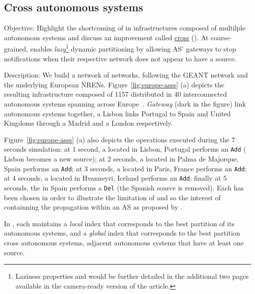 \subsection{Cross autonomous systems}
\begin{asparadesc}
\item[Objective:] Highlight the shortcoming of \NAME in
  infrastructures composed of multilple autonomous systems and
    discuss an improvement called \underline{cross} \underline{\NAME}
    (\NAMEC). At coarse-grained, \NAMEC enables
    \emph{lazy}\footnote{Laziness properties and \NAMEC would be
    further detailed in the  additional two pages available in the
    camera-ready version of the article.} dynamic partitioning by
    allowing AS' gateways to stop notifications when their respective
    network does not appear to have a source.
    
  \item[Description:] We build a network of networks, following the
    GEANT network and the underlying European NRENs.
    Figure~\ref{fig:europe-ases} (a) depicts the resulting
    infrastructure composed of 1157 \processes distributed in 40
    interconnected autonomous systems spanning across
    Europe~\cite{knight2011internet}. \emph{Gateway} \processes (dark
    in the figure) link autonomous systems together, \eg a Lisbon
    \node links Portugal to Spain and United Kingdoms through a Madrid
    \node and a London \node respectively.

    \noindent Figure~\ref{fig:europe-ases} (a) also depicts the
    operations executed during the 7 seconds simulation: at 1 second,
    a \node located in Lisbon, Portugal performs an \texttt{Add} (\ie
    Lisbon becomes a new source); at 2 seconds, a \node located in
    Palma de Majorque, Spain performs an \texttt{Add}; at 3 seconds, a
    \node located in Paris, France performs an \texttt{Add}; at 4
    seconds, a \node located in Hvanneyri, Iceland performs an
    \texttt{Add}; finally at 5 seconds, the \node in Spain performs a
    \texttt{Del} (the Spanish source is removed). Each \node has been
    chosen in order to illustrate the limitation of \NAME and so the
    interest of containning the propagation within an AS as proposed by
    \NAMEC.
    
    \noindent In \NAMEC, each
    \process maintains a \emph{local} index that corresponds to the
    best partition of its autonomous systems, and a \emph{global}
    index that corresponds to the best partition cross autonomous
    systems, \ie adjacent autonomous systems that have at least one
    source.
    

\end{asparadesc}
